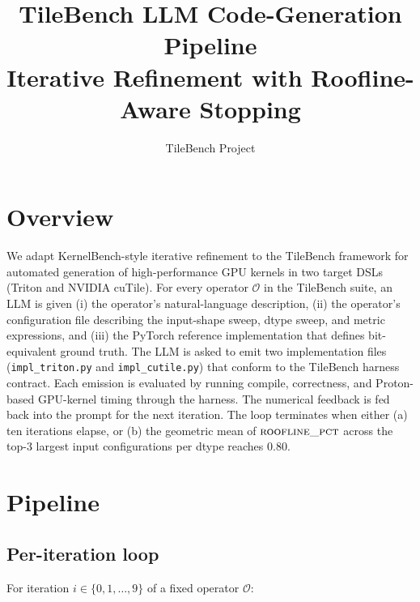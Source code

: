 \documentclass[11pt]{article}
\title{TileBench LLM Code-Generation Pipeline\\ \large Iterative Refinement with Roofline-Aware Stopping}
\author{TileBench Project}
\date{}
\begin{document}
\maketitle

\section{Overview}

We adapt KernelBench-style iterative refinement to the TileBench framework for
automated generation of high-performance GPU kernels in two target DSLs
(Triton and NVIDIA cuTile). For every operator $\mathcal{O}$ in the TileBench
suite, an LLM is given (i) the operator's natural-language description,
(ii) the operator's configuration file describing the input-shape sweep, dtype
sweep, and metric expressions, and (iii) the PyTorch reference implementation
that defines bit-equivalent ground truth. The LLM is asked to emit two
implementation files (\texttt{impl\_triton.py} and \texttt{impl\_cutile.py})
that conform to the TileBench harness contract. Each emission is evaluated by
running compile, correctness, and Proton-based GPU-kernel timing through the
harness. The numerical feedback is fed back into the prompt for the next
iteration. The loop terminates when either (a) ten iterations elapse, or (b)
the geometric mean of $\textsc{roofline\_pct}$ across the top-3 largest input
configurations per dtype reaches $0.80$.

\section{Pipeline}

\subsection{Per-iteration loop}

For iteration $i \in \{0, 1, \ldots, 9\}$ of a fixed operator $\mathcal{O}$:
\end{document}
